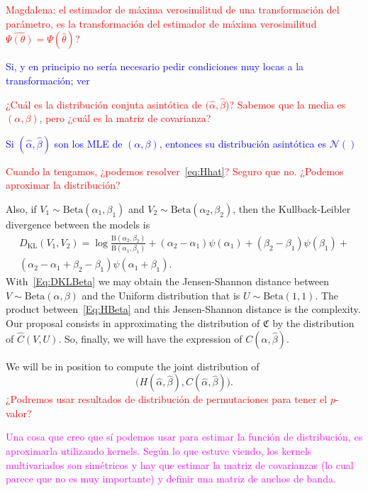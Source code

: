 \documentclass[12pt]{article}
\begin{document}
	\textcolor{red}{Magdalena: el estimador de máxima verosimilitud de una transformación del parámetro, es la transformación del estimador de máxima verosimilitud $\widehat{\Psi(\theta)}=\Psi(\widehat\theta)$?}
	
	\textcolor{blue}{Si, y en principio no sería necesario pedir condiciones muy locas a la transformación; ver \citet{CasellaBergerStatisticalInference}}
	
	\textcolor{red}{¿Cuál es la distribución conjuta asintótica de $(\widehat\alpha,\widehat\beta$)? Sabemos que la media es $(\alpha,\beta)$, pero ¿cuál es la matriz de covarianza?}
	
	\textcolor{blue}{ Si $(\widehat\alpha,\widehat\beta)$ son los MLE de $(\alpha,\beta)$, entonces su distribución asintótica es $\mathcal{N}()$}
	
	\textcolor{red}{Cuando la tengamos, ¿podemos resolver~\eqref{eq:Hhat}? Seguro que no. ¿Podemos aproximar la distribución?}
	
	Also, if $V_1\sim\text{Beta}(\alpha_1,\beta_1)$ and
	$V_2\sim\text{Beta}(\alpha_2,\beta_2)$, then the Kullback-Leibler divergence between the models is
	\begin{multline}
		D_{\text{KL}}(V_1,V_2) = \log\frac{\text{B}(\alpha_2,\beta_2)}{\text{B}(\alpha_1,\beta_1)} +
		(\alpha_2-\alpha_1) \psi(\alpha_1) +
		(\beta_2-\beta_1) \psi(\beta_1) + \\
		(\alpha_2-\alpha_1+\beta_2-\beta_1) \psi(\alpha_1+\beta_1).
		\label{Eq:DKLBeta}
	\end{multline}
	With~\eqref{Eq:DKLBeta} we may obtain the Jensen-Shannon distance between $V\sim\text{Beta}(\alpha,\beta)$ and the Uniform distribution that is $U\sim\text{Beta}(1,1)$.
	The product between~\eqref{Eq:HBeta} and this Jensen-Shannon distance is the complexity.
	Our proposal consists in approximating the distribution of $\mathfrak{C}$ by the distribution of $\widehat{C}(V,U)$.
	So, finally, we will have the expression of ${C}(\widehat\alpha,\widehat\beta)$.
	
	We will be in position to compute the joint distribution of 
	\begin{equation}
		\big( H (\widehat\alpha,\widehat\beta),
		C(\widehat\alpha,\widehat\beta)
		\big).    
	\end{equation}
	\textcolor{red}{¿Podremos usar resultados de distribución de permutaciones para tener el $p$-valor?}
	
	\textcolor{magenta}{ Una cosa que creo que sí podemos usar para estimar la función de distribución, es aproximarla utilizando kernels. Según lo que estuve viendo, los kernels multivariados son simétricos y hay que estimar la matriz de covarianzas (lo cual parece que no es muy importante) y definir una matriz de anchos de banda.}
	
\end{document}

